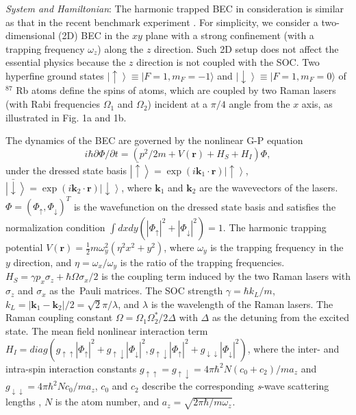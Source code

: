 \documentclass[prl,twocolumn,superscriptaddress,showpacs,floatfix]{revtex4}
\begin{document}
\textit{System and Hamiltonian}: The harmonic trapped BEC in consideration
is similar as that in the recent benchmark experiment \cite{Lin}. For
simplicity, we consider a two-dimensional (2D) BEC in the $xy$ plane with a
strong confinement (with a trapping frequency $\omega _{z}$) along the $z$
direction. Such 2D setup does not affect the essential physics because the $%
z $ direction is not coupled with the SOC. Two hyperfine ground states $%
\left\vert \uparrow \right\rangle \equiv |F=1,m_{F}=-1\rangle $ and $%
\left\vert \downarrow \right\rangle \equiv |F=1,m_{F}=0\rangle $ of $^{87}$%
Rb atoms define the spins of atoms, which are coupled by two Raman lasers
(with Rabi frequencies $\Omega _{1}$ and $\Omega _{2}$) incident at a $\pi
/4 $ angle from the $x$ axis, as illustrated in Fig. 1a and 1b.

The dynamics of the BEC are governed by the nonlinear G-P equation
\begin{equation}
i\hbar \partial \Phi /\partial t=\left( p^{2}/2m+V\left( \mathbf{r}\right)
+H_{S}+H_{I}\right) \Phi ,  \label{TGP}
\end{equation}%
under the dressed state basis $\left\vert \bar{\uparrow}\right\rangle =\exp
\left( i\mathbf{k}_{1}\cdot \mathbf{r}\right) \left\vert \uparrow
\right\rangle $, $\left\vert \bar{\downarrow}\right\rangle =\exp \left( i%
\mathbf{k}_{2}\cdot \mathbf{r}\right) \left\vert \downarrow \right\rangle $,
where $\mathbf{k}_{1}$ and $\mathbf{k}_{2}$ are the wavevectors of the
lasers. $\Phi =(\Phi _{\uparrow },\Phi _{\downarrow })^{T}$ is the
wavefunction on the dressed state basis and satisfies the normalization
condition $\int dxdy(|\Phi _{\uparrow }|^{2}+|\Phi _{\downarrow }|^{2})=1$.
The harmonic trapping potential $V\left( \mathbf{r}\right) =\frac{1}{2}%
m\omega _{y}^{2}(\eta ^{2}x^{2}+y^{2})$, where $\omega _{y}$ is the trapping
frequency in the $y$ direction, and $\eta =\omega _{x}/\omega _{y}$ is the
ratio of the trapping frequencies. $H_{S}=\gamma p_{x}\sigma _{z}+\hbar
\Omega \sigma _{x}/2$ is the coupling term induced by the two Raman lasers
with $\sigma _{z}$ and $\sigma _{x}$ as the\ Pauli matrices. The SOC
strength $\gamma =\hbar k_{L}/m$, $k_{L}=\left\vert \mathbf{k}_{1}-\mathbf{k}%
_{2}\right\vert /2=\sqrt{2}\pi /\lambda $, and $\lambda $ is the wavelength
of the Raman lasers. The Raman coupling constant $\Omega =\Omega _{1}\Omega
_{2}^{\ast }/2\Delta $ with $\Delta $ as the detuning from the excited
state. The mean field nonlinear interaction term $H_{I}=diag\left(
g_{\uparrow \uparrow }|\Phi _{\uparrow }|^{2}+g_{\uparrow \downarrow }|\Phi
_{\downarrow }|^{2},g_{\uparrow \downarrow }|\Phi _{\uparrow
}|^{2}+g_{\downarrow \downarrow }|\Phi _{\downarrow }|^{2}\right) $, where
the inter- and intra-spin interaction constants $g_{\uparrow \uparrow
}=g_{\uparrow \downarrow }=4\pi \hbar ^{2}N(c_{0}+c_{2})/ma_{z}$ and $%
g_{\downarrow \downarrow }=4\pi \hbar ^{2}Nc_{0}/ma_{z}$, $c_{0}$ and $c_{2}$
describe the corresponding \textit{s}-wave scattering lengths \cite{Ho2}, $N$
is the atom number, and $a_{z}=\sqrt{2\pi \hbar /m\omega _{z}}$.
\end{document}
